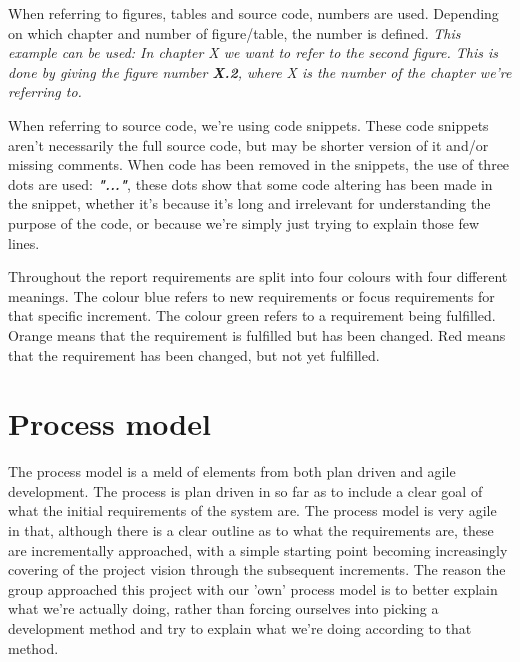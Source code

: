 When referring to figures, tables and source code, numbers are used. Depending on which chapter and number of figure/table, the number is defined. \newline
\textit{This example can be used: In chapter X we want to refer to the second figure. This is done by giving the figure number \textbf{X.2}, where X is the number of the chapter we're referring to.}
\newline


When referring to source code, we're using code snippets. These code snippets aren't necessarily the full source code, but may be shorter version of it and/or missing comments. When code has been removed in the snippets, the use of three dots are used:  \textit\textbf{{"..."}}, these dots show that some code altering has been made in the snippet, whether it's because it's long and irrelevant for understanding the purpose of the code, or because we're simply just trying to explain those few lines. 


Throughout the report requirements are split into four colours with four different meanings. The colour blue refers to new requirements or focus requirements for that specific increment. The colour green refers to a requirement being fulfilled. Orange means that the requirement is fulfilled but has been changed. Red means that the requirement has been changed, but not yet fulfilled. 


\chapter{Process model}
\label{Process model}
The process model is a meld of elements from both plan driven and agile development. The process is plan driven in so far as to include a clear goal of what the initial requirements of the system are. The process model is very agile in that, although there is a clear outline as to what the requirements are, these are incrementally approached, with a simple starting point becoming increasingly covering of the project vision through the subsequent increments. The reason the group approached this project with our 'own' process model is to better explain what we're actually doing, rather than forcing ourselves into picking a development method and try to explain what we're doing according to that method.


